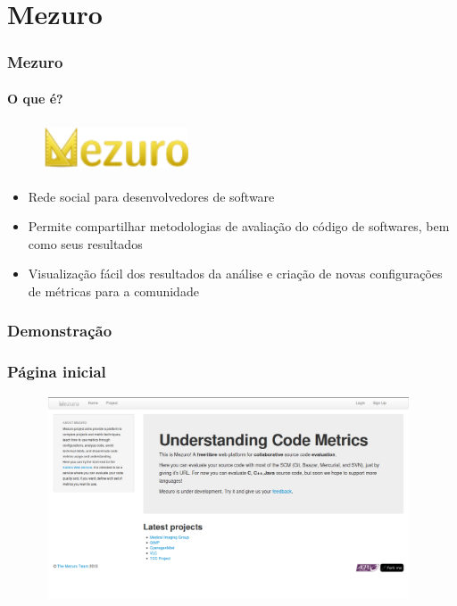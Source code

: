 \documentclass{beamer}
\begin{document}
  \section{Mezuro}
  \begin{frame}
    \frametitle{Mezuro}
    \framesubtitle{O que é?}
    
    \begin{figure}
      \begin{flushleft}
      \begin{center}
      \includegraphics[width=4.3cm, height=1.4cm]{images/logo-mezuro.png}
      \end{center}
        
        \label{fig:logo-mezuro}
      \end{flushleft}
    \end{figure}
    
    \begin{itemize}
      \item Rede social para desenvolvedores de software
      \item Permite compartilhar metodologias de avaliação do código de softwares, bem como seus resultados
      \item Visualização fácil dos resultados da análise e criação de novas configurações de métricas para a comunidade
    \end{itemize}
  
  \end{frame}
  
  \subsubsection{Demonstração}
  
    \begin{frame}
      \frametitle{Página inicial}
      
      \begin{figure}
        \begin{center}
          \includegraphics[width=11cm, height=6cm]{images/main.png}
          \label{fig:home}
        \end{center}
      \end{figure}
    
    \end{frame}
    
\end{document}

